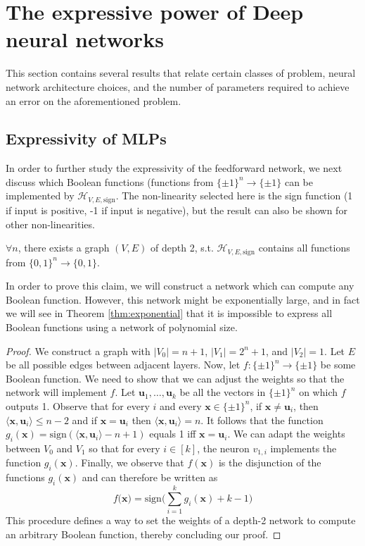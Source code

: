 \documentclass{article}
\begin{document}
\section{The expressive power of Deep neural networks}
\label{sec:expressive-dnns}
This section contains several results that relate certain classes of problem, neural network architecture choices, and the number of parameters required to achieve an error on the aforementioned problem. 

\subsection{Expressivity of MLPs}
In order to further study the expressivity of the feedforward network, we next discuss which Boolean functions (functions from $\{\pm 1\}^n \to \{\pm 1\}$ can be implemented by $\mathcal{H}_{V, E, \text{sign}}$. The non-linearity selected here is the sign function (1 if input is positive, -1 if input is negative), but the result can also be shown for other non-linearities.

\begin{clm}
$\forall n$, there exists a graph $(V, E)$ of depth 2, s.t. $\mathcal{H}_{V, E, \text{sign}}$ contains all functions from $\{0, 1\}^n \to \{0, 1\}$.
\end{clm}

In order to prove this claim, we will construct a network which can compute any Boolean function. However, this network might be exponentially large, and in fact we will see in Theorem \ref{thm:exponential} that it is impossible to express all Boolean functions using a network of polynomial size.

\begin{proof}
We construct a graph with $|V_0| = n + 1$, $|V_1| = 2^n + 1$, and $|V_2| = 1$. Let $E$ be all possible edges between adjacent layers. Now, let $f: \{\pm 1\}^n \to \{\pm 1\}$ be some Boolean function. We need to show that we can adjust the weights so that the network will implement $f$. Let $\textbf{u}_1, \dots, \textbf{u}_k$ be all the vectors in $\{\pm 1\}^n$ on which $f$ outputs 1. Observe that for every $i$ and every $\textbf{x} \in \{ \pm 1\}^n$, if $\textbf{x} \neq \textbf{u}_i$, then $\langle\textbf{x}, \textbf{u}_i \rangle \leq n - 2$ and if $\textbf{x} = \textbf{u}_i$ then $\langle\textbf{x}, \textbf{u}_i \rangle = n$. 
\vspace{5mm}
It follows that the function $g_i(\textbf{x}) = \text{sign}(\langle\textbf{x}, \textbf{u}_i \rangle - n + 1)$ equals 1 iff $\textbf{x} = \textbf{u}_i$. We can adapt the weights between $V_0$ and $V_1$ so that for every $i \in [k]$, the neuron $v_{1, i}$ implements the function $g_i(\textbf{x})$. Finally, we observe that $f(\textbf{x})$ is the disjunction of the functions $g_i(\textbf{x})$ and can therefore be written as $$f(\textbf{x)} = \text{sign} \bigg(\sum_{i=1}^k g_i(\textbf{x}) + k - 1 \bigg)$$
This procedure defines a way to set the weights of a depth-2 network to compute an arbitrary Boolean function, thereby concluding our proof.
\end{proof}
\end{document}
